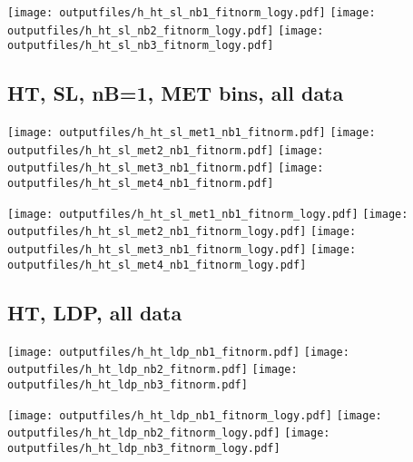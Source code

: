 \documentclass[11pt]{article}
\begin{document}
    \noindent
     \texttt{[image: outputfiles/h\_ht\_sl\_nb1\_fitnorm\_logy.pdf]}
     \texttt{[image: outputfiles/h\_ht\_sl\_nb2\_fitnorm\_logy.pdf]}
     \texttt{[image: outputfiles/h\_ht\_sl\_nb3\_fitnorm\_logy.pdf]}


     \subsection{ HT, SL, nB=1, MET bins, all data}

    \noindent
     \texttt{[image: outputfiles/h\_ht\_sl\_met1\_nb1\_fitnorm.pdf]}
     \texttt{[image: outputfiles/h\_ht\_sl\_met2\_nb1\_fitnorm.pdf]}
     \texttt{[image: outputfiles/h\_ht\_sl\_met3\_nb1\_fitnorm.pdf]}
     \texttt{[image: outputfiles/h\_ht\_sl\_met4\_nb1\_fitnorm.pdf]}

    \noindent
     \texttt{[image: outputfiles/h\_ht\_sl\_met1\_nb1\_fitnorm\_logy.pdf]}
     \texttt{[image: outputfiles/h\_ht\_sl\_met2\_nb1\_fitnorm\_logy.pdf]}
     \texttt{[image: outputfiles/h\_ht\_sl\_met3\_nb1\_fitnorm\_logy.pdf]}
     \texttt{[image: outputfiles/h\_ht\_sl\_met4\_nb1\_fitnorm\_logy.pdf]}

   \clearpage














    \subsection{ HT, LDP, all data}

    \noindent
     \texttt{[image: outputfiles/h\_ht\_ldp\_nb1\_fitnorm.pdf]}
     \texttt{[image: outputfiles/h\_ht\_ldp\_nb2\_fitnorm.pdf]}
     \texttt{[image: outputfiles/h\_ht\_ldp\_nb3\_fitnorm.pdf]}

    \noindent
     \texttt{[image: outputfiles/h\_ht\_ldp\_nb1\_fitnorm\_logy.pdf]}
     \texttt{[image: outputfiles/h\_ht\_ldp\_nb2\_fitnorm\_logy.pdf]}
     \texttt{[image: outputfiles/h\_ht\_ldp\_nb3\_fitnorm\_logy.pdf]}
\end{document}
